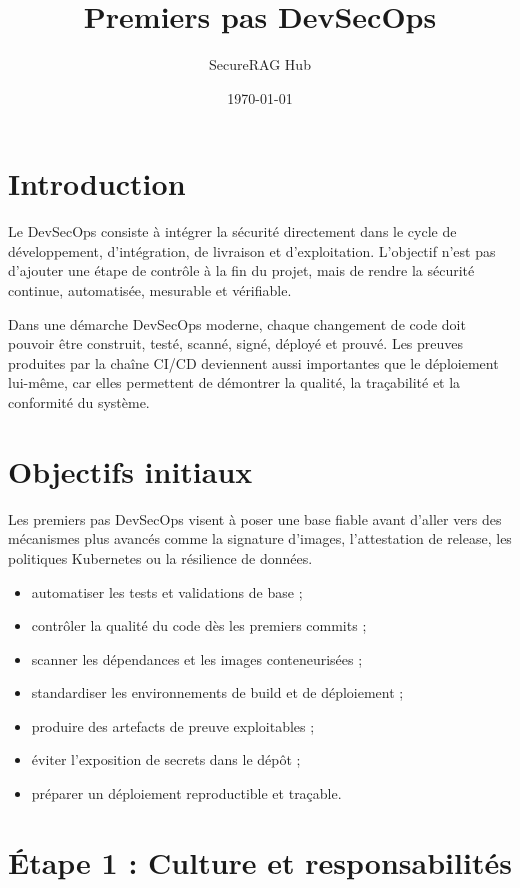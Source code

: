 \documentclass[12pt,a4paper]{article}
\title{Premiers pas DevSecOps}
\author{SecureRAG Hub}
\date{\today}
\begin{document}
\maketitle

\section{Introduction}

Le DevSecOps consiste à intégrer la sécurité directement dans le cycle de
développement, d'intégration, de livraison et d'exploitation. L'objectif n'est
pas d'ajouter une étape de contrôle à la fin du projet, mais de rendre la
sécurité continue, automatisée, mesurable et vérifiable.

Dans une démarche DevSecOps moderne, chaque changement de code doit pouvoir
être construit, testé, scanné, signé, déployé et prouvé. Les preuves produites
par la chaîne CI/CD deviennent aussi importantes que le déploiement lui-même,
car elles permettent de démontrer la qualité, la traçabilité et la conformité du
système.

\section{Objectifs initiaux}

Les premiers pas DevSecOps visent à poser une base fiable avant d'aller vers des
mécanismes plus avancés comme la signature d'images, l'attestation de release,
les politiques Kubernetes ou la résilience de données.

\begin{itemize}[leftmargin=*]
  \item automatiser les tests et validations de base ;
  \item contrôler la qualité du code dès les premiers commits ;
  \item scanner les dépendances et les images conteneurisées ;
  \item standardiser les environnements de build et de déploiement ;
  \item produire des artefacts de preuve exploitables ;
  \item éviter l'exposition de secrets dans le dépôt ;
  \item préparer un déploiement reproductible et traçable.
\end{itemize}

\section{Étape 1 : Culture et responsabilités}
\end{document}
